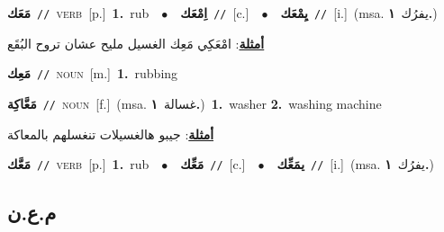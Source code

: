 \documentclass[10pt,a4paper,twoside]{article} %
\begin{document}
\begin{multicols}{2}
{\setlength\topsep{0pt}\textbf{\foreignlanguage{arabic}{مَعَك}}\ {\color{gray}\texttt{//}\color{black}}\ \textsc{verb}\ [p.]\ \textbf{1.}~rub\ \ $\bullet$\ \ \setlength\topsep{0pt}\textbf{\foreignlanguage{arabic}{اِمْعَك}}\ {\color{gray}\texttt{//}\color{black}}\ [c.]\ \ $\bullet$\ \ \setlength\topsep{0pt}\textbf{\foreignlanguage{arabic}{يِمْعَك}}\ {\color{gray}\texttt{//}\color{black}}\ [i.]\ \color{gray}(msa. \foreignlanguage{arabic}{يفرُك}~\foreignlanguage{arabic}{\textbf{١.}})\color{black}\  \begin{flushright}\color{gray}\foreignlanguage{arabic}{\textbf{\underline{\foreignlanguage{arabic}{أمثلة}}}: امْعَكِي مَعِك الغسيل مليح عشان تروح البُقَع}\end{flushright}\color{black}} \vspace{2mm}

{\setlength\topsep{0pt}\textbf{\foreignlanguage{arabic}{مَعِك}}\ {\color{gray}\texttt{//}\color{black}}\ \textsc{noun}\ [m.]\ \textbf{1.}~rubbing\ } \vspace{2mm}

{\setlength\topsep{0pt}\textbf{\foreignlanguage{arabic}{مَعَّاكِة}}\ {\color{gray}\texttt{//}\color{black}}\ \textsc{noun}\ [f.]\ \color{gray}(msa. \foreignlanguage{arabic}{غسالة}~\foreignlanguage{arabic}{\textbf{١.}})\color{black}\ \textbf{1.}~washer  \textbf{2.}~washing machine\  \begin{flushright}\color{gray}\foreignlanguage{arabic}{\textbf{\underline{\foreignlanguage{arabic}{أمثلة}}}: جيبو هالغسيلات تنغسلهم بالمعاكة}\end{flushright}\color{black}} \vspace{2mm}

{\setlength\topsep{0pt}\textbf{\foreignlanguage{arabic}{مَعَّك}}\ {\color{gray}\texttt{//}\color{black}}\ \textsc{verb}\ [p.]\ \textbf{1.}~rub\ \ $\bullet$\ \ \setlength\topsep{0pt}\textbf{\foreignlanguage{arabic}{مَعِّك}}\ {\color{gray}\texttt{//}\color{black}}\ [c.]\ \ $\bullet$\ \ \setlength\topsep{0pt}\textbf{\foreignlanguage{arabic}{يمَعِّك}}\ {\color{gray}\texttt{//}\color{black}}\ [i.]\ \color{gray}(msa. \foreignlanguage{arabic}{يفرُك}~\foreignlanguage{arabic}{\textbf{١.}})\color{black}\ } \vspace{2mm}

\vspace{-3mm}
\subsection*{\color{blue}\foreignlanguage{arabic}{م.ع.ن}\color{blue}{}} 


\end{multicols}
\end{document}
